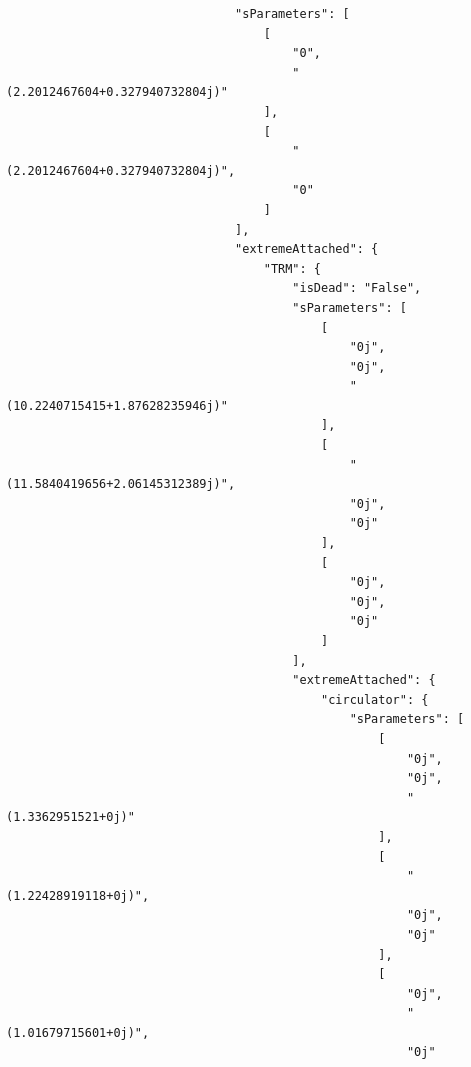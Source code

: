 \begin{verbatim}
                                "sParameters": [
                                    [
                                        "0",
                                        "(2.2012467604+0.327940732804j)"
                                    ],
                                    [
                                        "(2.2012467604+0.327940732804j)",
                                        "0"
                                    ]
                                ],
                                "extremeAttached": {
                                    "TRM": {
                                        "isDead": "False",
                                        "sParameters": [
                                            [
                                                "0j",
                                                "0j",
                                                "(10.2240715415+1.87628235946j)"
                                            ],
                                            [
                                                "(11.5840419656+2.06145312389j)",
                                                "0j",
                                                "0j"
                                            ],
                                            [
                                                "0j",
                                                "0j",
                                                "0j"
                                            ]
                                        ],
                                        "extremeAttached": {
                                            "circulator": {
                                                "sParameters": [
                                                    [
                                                        "0j",
                                                        "0j",
                                                        "(1.3362951521+0j)"
                                                    ],
                                                    [
                                                        "(1.22428919118+0j)",
                                                        "0j",
                                                        "0j"
                                                    ],
                                                    [
                                                        "0j",
                                                        "(1.01679715601+0j)",
                                                        "0j"

\end{verbatim}

